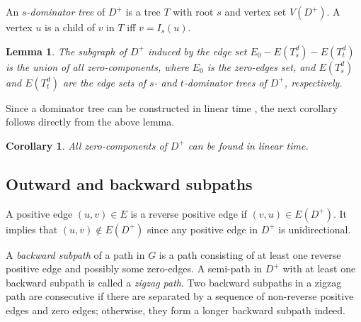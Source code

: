 \documentclass[review]{elsarticle}
\def\squarebox#1{\hbox to #1{\hfill\vbox to #1{\vfill}}}
\renewcommand{\qed}{\hspace*{\fill}
            \vbox{\hrule\hbox{\vrule\squarebox{.667em}\vrule}\hrule}\smallskip\newline}
\newtheorem{lem}[thm]{Lemma}
\newtheorem{cor}[thm]{Corollary}
\begin{document}
An \emph{$s$-dominator tree} \cite{als99} of $D^+$ is a tree $T$
with root $s$ and vertex set $V(D^+)$. A vertex $u$ is a child of
$v$ in $T$ iff $v=I_s(u)$.
\begin{lem}
The subgraph of $D^+$ induced by the edge set
$E_0-E(T_s^d)-E(T_t^d)$ is the union of all zero-components, where
$E_0$ is the zero-edges set, and $E(T_s^d)$ and $E(T_t^d)$ are the
edge sets of $s$- and $t$-dominator trees of $D^+$, respectively.
\end{lem}

Since a dominator tree can be constructed in linear time
\cite{als99}, the next corollary follows directly from the above
lemma.

\begin{cor}
All zero-components of $D^+$ can be found in linear time.
\end{cor}

\subsection{Outward and backward subpaths}

A positive edge $(u,v)\in E$ is a reverse positive edge if $(v,u)\in
E(D^+)$. It implies that $(u,v)\notin E(D^+)$ since any positive
edge in $D^+$ is unidirectional.

\begin{defi}
A {\em backward subpath} of a path in $G$ is a path consisting of at
least one reverse positive edge and possibly some zero-edges. A
semi-path in $D^+$ with at least one backward subpath is called a
{\em zigzag path}. Two backward subpaths in a zigzag path are
consecutive if there are separated by a sequence of non-reverse
positive edges and zero edges; otherwise, they form a longer
backward subpath indeed.\footnotemark[4]
\end{defi}
\end{document}
